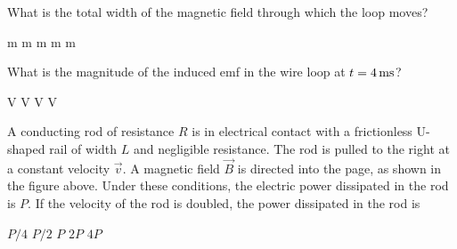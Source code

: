 \documentclass{../../../oss-apphys-exam}
\begin{document}
\begin{questions}
  \question What is the total width of the magnetic field through which the
  loop moves?
  \begin{choices}
     m
     m
     m
     m
     m
  \end{choices}
  \label{loop1}
  
  \question What is the magnitude of the induced emf in the wire loop at
  $t=\SI4{\milli\second}$?
  \begin{choices}
     V
     V
     V
     V
  \end{choices}
  \label{loop2}

  \question A conducting rod of resistance $R$ is in electrical contact with a
  frictionless U-shaped rail of width $L$ and negligible resistance. The rod is
  pulled to the right at a constant velocity $\vec v$. A magnetic field
  $\vec B$ is directed into the page, as shown in the figure above. Under these
  conditions, the electric power dissipated in the rod is $P$. If the velocity
  of the rod is doubled, the power dissipated in the rod is
  \begin{choices}
    \choice $P/4$
    \choice $P/2$
    \choice $P$
    \choice $2P$
    \choice $4P$
  \end{choices}


\end{questions}
\end{document}
